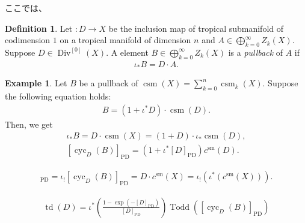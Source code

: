 \documentclass[a4paper,dvipdfmx,reqno,12pt]{amsart}
\theoremstyle{definition}
\newtheorem{definition}[theorem]{Definition}
\newtheorem{example}[theorem]{Example}
\newtheorem{remark}[theorem]{Remark}
\newcommand{\deq}{\coloneqq}
\newcommand{\opn}[1]{\operatorname{#1}}
\newcommand{\PD}[1]{[#1]_{\mathrm{PD}}}
\numberwithin{equation}{section}
\begin{document}

ここでは、



\begin{definition}
Let $\colon D\to X$ be the inclusion map
of tropical submanifold of codimension $1$ on
a tropical manifold of dimension $n$ 
and $A\in\bigoplus_{k=0}^{\infty} Z_{k}(X)$.
Suppose $D\in \opn{Div}^{[0]}(X)$.
A element $B\in\bigoplus_{k=0}^{\infty} Z_{k}(X)$
is a \emph{pullback} of $A$ if
\begin{align}
	\iota_* B=D\cdot A.
\end{align}
\end{definition}

\begin{example}
Let $B$ be a pullback of $\opn{csm}(X)=
\sum_{k=0}^{n}\opn{csm}_k(X)$.
Suppose the following equation holds:
\begin{align}
B=(1+\iota^{*}D)\cdot \opn{csm}(D).
\end{align}
Then, we get 
\begin{align}
\iota_*B=D\cdot \opn{csm}(X)
=(1+D)\cdot \iota_*\opn{csm}(D),\\
\PD{\opn{cyc}_D(B)}=(1+\iota^{*}\PD{D})c^{\mathrm{sm}}(D).
\end{align}

\begin{align}
\PD{\opn{cyc}_D(\iota_*B)}=\iota_!\PD{\opn{cyc}_D(B)}
=D\cdot c^{\mathrm{sm}}(X)=
\iota_{!}(\iota^{*}(c^{\mathrm{sm}}(X))).
\end{align}

\begin{align}
\opn{td}(D)=\iota^{*}\left(
\frac{1-\opn{exp}(-\PD{D})}{
\PD{D}}\right)\opn{Todd}(\PD{\opn{cyc}_D(B)})
\end{align}

\end{example}
\end{document}
